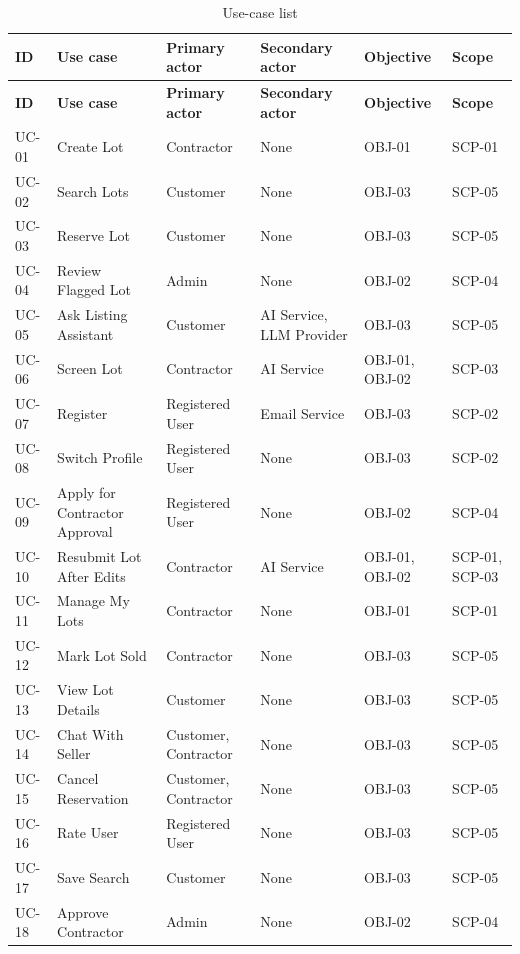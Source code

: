 {\footnotesize
\begin{longtable}{@{}p{}p{}p{}p{}p{}p{}@{}}
\caption{Use-case list}\label{tab:use-case-list}\\
\toprule
\textbf{ID} & \textbf{Use case} & \textbf{Primary actor} & \textbf{Secondary actor} & \textbf{Objective} & \textbf{Scope} \\
\midrule
\endfirsthead
\toprule
\textbf{ID} & \textbf{Use case} & \textbf{Primary actor} & \textbf{Secondary actor} & \textbf{Objective} & \textbf{Scope} \\
\midrule
\endhead
UC-01 & Create Lot & Contractor & None & OBJ-01 & SCP-01 \\
UC-02 & Search Lots & Customer & None & OBJ-03 & SCP-05 \\
UC-03 & Reserve Lot & Customer & None & OBJ-03 & SCP-05 \\
UC-04 & Review Flagged Lot & Admin & None & OBJ-02 & SCP-04 \\
UC-05 & Ask Listing Assistant & Customer & AI Service, LLM Provider & OBJ-03 & SCP-05 \\
UC-06 & Screen Lot & Contractor & AI Service & OBJ-01, OBJ-02 & SCP-03 \\
UC-07 & Register & Registered User & Email Service & OBJ-03 & SCP-02 \\
UC-08 & Switch Profile & Registered User & None & OBJ-03 & SCP-02 \\
UC-09 & Apply for Contractor Approval & Registered User & None & OBJ-02 & SCP-04 \\
UC-10 & Resubmit Lot After Edits & Contractor & AI Service & OBJ-01, OBJ-02 & SCP-01, SCP-03 \\
UC-11 & Manage My Lots & Contractor & None & OBJ-01 & SCP-01 \\
UC-12 & Mark Lot Sold & Contractor & None & OBJ-03 & SCP-05 \\
UC-13 & View Lot Details & Customer & None & OBJ-03 & SCP-05 \\
UC-14 & Chat With Seller & Customer, Contractor & None & OBJ-03 & SCP-05 \\
UC-15 & Cancel Reservation & Customer, Contractor & None & OBJ-03 & SCP-05 \\
UC-16 & Rate User & Registered User & None & OBJ-03 & SCP-05 \\
UC-17 & Save Search & Customer & None & OBJ-03 & SCP-05 \\
UC-18 & Approve Contractor & Admin & None & OBJ-02 & SCP-04 \\

\end{longtable}}

